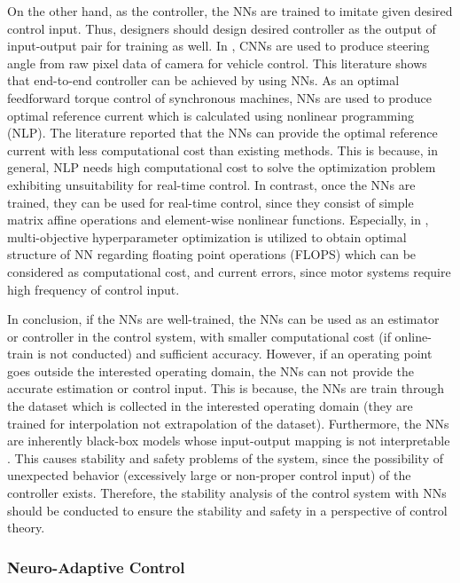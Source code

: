 On the other hand, as the controller, the NNs are trained to imitate given desired control input.
Thus, designers should design desired controller as the output of input-output pair for training as well.
In \cite{RN117, RN116}, CNNs are used to produce steering angle from raw pixel data of camera for vehicle control.
This literature shows that end-to-end controller can be achieved by using NNs. 
As an optimal feedforward torque control of synchronous machines, NNs are used to produce optimal reference current \cite{RN112, RN113, RN114} which is calculated using nonlinear programming (NLP).
The literature reported that the NNs can provide the optimal reference current with less computational cost than existing methods.
This is because, in general, NLP needs high computational cost to solve the optimization problem exhibiting unsuitability for real-time control.
In contrast, once the NNs are trained, they can be used for real-time control, since they consist of simple matrix affine operations and element-wise nonlinear functions.
Especially, in \cite{RN114}, multi-objective hyperparameter optimization is utilized to obtain optimal structure of NN regarding floating point operations (FLOPS) which can be considered as computational cost, and current errors, since motor systems require high frequency of control input.

In conclusion, if the NNs are well-trained, the NNs can be used as an estimator or controller in the control system, with smaller computational cost (if online-train is not conducted) and sufficient accuracy.
However, if an operating point goes outside the interested operating domain, the NNs can not provide the accurate estimation or control input.
This is because, the NNs are train through the dataset which is collected in the interested operating domain (\ie they are trained for interpolation not extrapolation of the dataset).
Furthermore, the NNs are inherently black-box models whose input-output mapping is not interpretable \cite{RN16, RN17}.
This causes stability and safety problems of the system, since the possibility of unexpected behavior (\eg excessively large or non-proper control input) of the controller exists.
Therefore, the stability analysis of the control system with NNs should be conducted to ensure the stability and safety in a perspective of control theory.

\subsubsection{Neuro-Adaptive Control}

